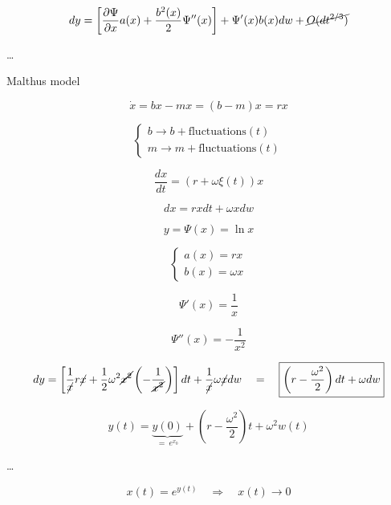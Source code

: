 $$
dy = \left[
    \dfrac{\partial \Psi}{\partial x} a(x) + \dfrac{b^2(x)}2 \Psi''(x)
\right]
+ \Psi'(x) b(x) dw + \cancel{O(dt^{2/3})}
$$

\dots

\newpage

Malthus model

$$
\dot x = bx - mx = (b-m)x = rx
$$

$$
\begin{cases}
b \rightarrow b + \text{fluctuations}(t)\\
m \rightarrow m + \text{fluctuations}(t)
\end{cases}
$$

$$
\dfrac {dx}{dt} = (r + \omega \xi(t))x
$$

$$
dx = rxdt + \omega x dw
$$

$$
y = \Psi(x) = \ln x
$$

$$
\begin{cases}
a(x) = rx\\
b(x) = \omega x
\end{cases}
$$

$$
\Psi'(x) = \dfrac 1x
$$

$$
\Psi''(x) = -\dfrac 1{x^2}
$$

$$
dy = 
\left[
    \dfrac 1{\cancel x} r\cancel x + \dfrac 12 \omega^2\cancel{x^2}  
    \left( 
        - \dfrac 1{\cancel{x^2}} 
    \right)
\right]
dt + \dfrac 1{\cancel x} \omega \cancel x dw
\quad = \quad
\boxed{
    \left(
        r - \dfrac {\omega^2}2
    \right)
    dt + \omega dw
}
$$

$$
y(t) = \underbrace{y(0)}_{=\ e^{x_0}} + \left(
    r - \dfrac {\omega^2}2
\right) t + \omega^2 w(t)
$$

\dots

$$
\boxed{x(t) = e^{y(t)}}
\quad \Rightarrow \quad
x(t) \to 0
$$
